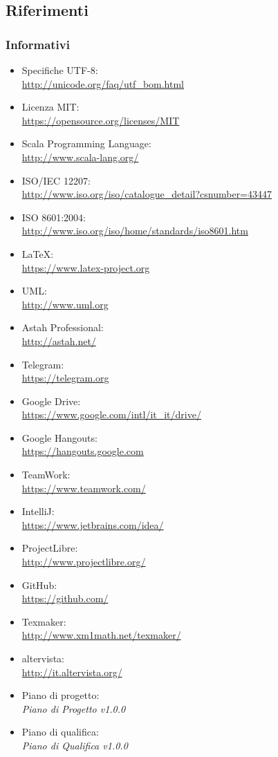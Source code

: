 \documentclass[a4paper]{article}
\begin{document}
		\subsection{Riferimenti}
			\subsubsection{Informativi}
				\begin{itemize}
					\item Specifiche UTF-8: \\ \url{http://unicode.org/faq/utf_bom.html}
					\item Licenza MIT: \\ \url{https://opensource.org/licenses/MIT}
					\item Scala Programming Language: \\ \url{http://www.scala-lang.org/}
					\item ISO/IEC 12207: \\ \url{http://www.iso.org/iso/catalogue_detail?csnumber=43447}
					\item ISO 8601:2004: \\ \url{http://www.iso.org/iso/home/standards/iso8601.htm}
					\item \LaTeX: \\ \url{https://www.latex-project.org}
					\item UML: \\ \url{http://www.uml.org}
					\item Astah Professional: \\ \url{http://astah.net/}
					\item Telegram: \\ \url{https://telegram.org}
					\item Google Drive: \\ \url{https://www.google.com/intl/it_it/drive/}
					\item Google Hangouts: \\ \url{https://hangouts.google.com}
					\item TeamWork: \\ \url{https://www.teamwork.com/}
					\item IntelliJ: \\ \url{https://www.jetbrains.com/idea/}
					\item ProjectLibre: \\ \url{http://www.projectlibre.org/}
					\item GitHub: \\ \url{https://github.com/}
					\item Texmaker: \\ \url{http://www.xm1math.net/texmaker/}
					\item altervista: \\ \url{http://it.altervista.org/}
					\item Piano di progetto: \\ \emph{Piano di Progetto v1.0.0}
					\item Piano di qualifica: \\ \emph{Piano di Qualifica v1.0.0}
				\end{itemize}
\end{document}
